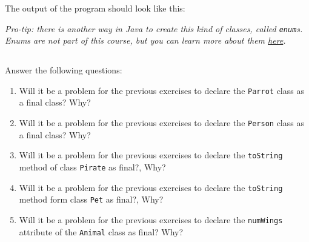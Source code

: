 \documentclass[a4paper, 11pt]{article}
\begin{document}
The output of the program should look like this:


\textsl{Pro-tip: there is another way in Java to create this kind of classes,
called \texttt{enum}s. Enums are not part of this course, but you can learn
more about them
\href{http://docs.oracle.com/javase/tutorial/java/javaOO/enum.html}{here}.}













\subsection{}

Answer the following questions:

\begin{enumerate}

  \item Will it be a problem for the previous exercises to declare the
    \verb+Parrot+ class as a final class? Why?

  \item Will it be a problem for the previous exercises to declare the
    \verb+Person+ class as a final class? Why?

  \item Will it be a problem for the previous exercises to declare the
    \verb+toString+ method of class \verb+Pirate+ as final?, Why?

  \item Will it be a problem for the previous exercises to declare the
    \verb+toString+ method form class \verb+Pet+ as final?, Why?

  \item Will it be a problem for the previous exercises to declare the
    \verb+numWings+ attribute of the \verb+Animal+ class as final? Why?

\end{enumerate}
\end{document}
